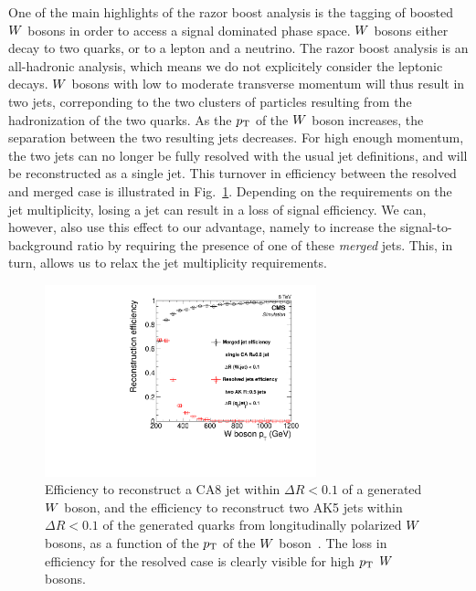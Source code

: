 
One of the main highlights of the razor boost analysis is the tagging of boosted $W$ bosons in
order to access a signal dominated phase space. 
$W$ bosons either decay to two quarks, or to a lepton and a neutrino. The razor boost analysis is
an all-hadronic analysis, which means we do not explicitely consider the leptonic decays. 
$W$ bosons with low to moderate transverse momentum will thus result in two jets, correponding to
the two clusters of particles resulting from the hadronization of the two quarks. 
As the $p_{\mathrm{T}}$ of the $W$ boson increases, the separation between the two resulting jets decreases.
For high enough momentum, the two jets can no longer be fully resolved with the usual jet
definitions, and will be reconstructed as a single jet. This turnover in efficiency between the
resolved and merged case is illustrated in Fig.~\ref{fig:boost_wtag_ca8eff}.
Depending on the requirements on the jet multiplicity, losing a jet can result in a loss of signal
efficiency. We can, however, also use this effect to our advantage, namely to increase the
signal-to-background ratio by requiring the presence of one of these \textit{merged} jets. 
This, in turn, allows us to relax the jet multiplicity requirements. 

\begin{figure}
  \centering
  \includegraphics[width=0.7\textwidth]{figures/razor_wtag/ca8effVsPt}
  \caption{Efficiency to reconstruct a CA8 jet within $\Delta R<0.1$ of a generated $W$ boson, and
the efficiency to reconstruct two AK5 jets within $\Delta R<0.1$ of the generated quarks from
longitudinally polarized $W$ bosons, as a function of the $p_{\mathrm{T}}$ of the $W$
boson~\cite{Khachatryan:2014vla}. The loss in efficiency for the resolved case is clearly visible
for high $p_{\mathrm{T}}$ $W$ bosons. 
  \label{fig:boost_wtag_ca8eff}}
\end{figure}


